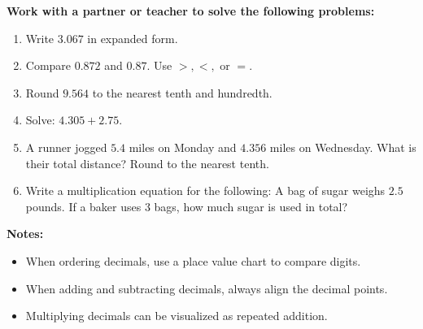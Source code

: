 \documentclass[12pt]{article}
\begin{document}
\begin{tcolorbox}[colframe=black!60, colback=white, 
coltitle=black, colbacktitle=black!15, fonttitle=\bfseries\Large, 
title=Guided Practice, halign title=center, left=10pt, right=10pt, top=10pt, bottom=15pt]
\textbf{Work with a partner or teacher to solve the following problems:}
\begin{enumerate}[itemsep=3em]
    \item Write \( 3.067 \) in expanded form.
    \item Compare \( 0.872 \) and \( 0.87 \). Use \( >, <, \) or \( = \).
    \item Round \( 9.564 \) to the nearest tenth and hundredth.
    \item Solve: \( 4.305 + 2.75 \).
    \item A runner jogged \( 5.4 \) miles on Monday and \( 4.356 \) miles on Wednesday. What is their total distance? Round to the nearest tenth.
    \item Write a multiplication equation for the following: A bag of sugar weighs \( 2.5 \) pounds. If a baker uses \( 3 \) bags, how much sugar is used in total?
\end{enumerate}
\end{tcolorbox}

\vspace{1em}

\begin{tcolorbox}[colframe=black!40, colback=gray!5, 
coltitle=black, colbacktitle=black!20, fonttitle=\bfseries\Large, 
title=Additional Notes, halign title=center, left=5pt, right=5pt, top=5pt, bottom=15pt]
\textbf{Notes:}
\begin{itemize}
    \item When ordering decimals, use a place value chart to compare digits.
    \item When adding and subtracting decimals, always align the decimal points.
    \item Multiplying decimals can be visualized as repeated addition.
\end{itemize}
\end{tcolorbox}

\vspace{1em}
\end{document}
